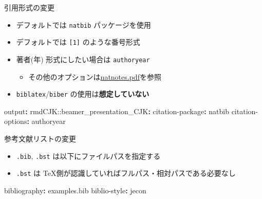 \documentclass[
  12pt,
  ignorenonframetext,
]{beamer}
\newenvironment{Shaded}{\begin{snugshade}}{\end{snugshade}}
\newcommand{\AttributeTok}[1]{\textcolor[rgb]{0.77,0.63,0.00}{#1}}
\newcommand{\FunctionTok}[1]{\textcolor[rgb]{0.00,0.00,0.00}{#1}}
\newcommand{\KeywordTok}[1]{\textcolor[rgb]{0.13,0.29,0.53}{\textbf{#1}}}
\providecommand{\tightlist}{%
  \setlength{\itemsep}{0pt}\setlength{\parskip}{0pt}}
\begin{document}
\begin{frame}[fragile]{引用形式の変更}
\protect\hypertarget{ux5f15ux7528ux5f62ux5f0fux306eux5909ux66f4}{}

\begin{itemize}
\tightlist
\item
  デフォルトでは \texttt{natbib} パッケージを使用
\item
  デフォルトでは \texttt{{[}1{]}} のような番号形式
\item
  著者(年) 形式にしたい場合は \texttt{authoryear}

  \begin{itemize}
  \tightlist
  \item
    その他のオプションは\href{http://texdoc.net/texmf-dist/doc/latex/natbib/natnotes.pdf}{natnotes.pdf}を参照
  \end{itemize}
\item
  \texttt{biblatex}/\texttt{biber} の使用は\textbf{想定していない}
\end{itemize}

\begin{Shaded}
\begin{Highlighting}[]
\FunctionTok{output}\KeywordTok{:}
\AttributeTok{  rmdCJK:}\FunctionTok{:beamer_presentation_CJK}\KeywordTok{:}
\AttributeTok{    }\FunctionTok{citation-package}\KeywordTok{:}\AttributeTok{ natbib}
\AttributeTok{    }\FunctionTok{citation-options}\KeywordTok{:}\AttributeTok{ authoryear}
\end{Highlighting}
\end{Shaded}

\end{frame}

\begin{frame}[fragile]{参考文献リストの変更}
\protect\hypertarget{ux53c2ux8003ux6587ux732eux30eaux30b9ux30c8ux306eux5909ux66f4}{}

\begin{itemize}
\tightlist
\item
  \texttt{.bib}, \texttt{.bst} は以下にファイルパスを指定する
\item
  \texttt{.bst} は TeX側が認識していればフルパス・相対パスである必要なし
\end{itemize}

\begin{Shaded}
\begin{Highlighting}[]
\FunctionTok{bibliography}\KeywordTok{:}\AttributeTok{ examples.bib}
\FunctionTok{biblio-style}\KeywordTok{:}\AttributeTok{ jecon}
\end{Highlighting}
\end{Shaded}

\end{frame}
\end{document}
